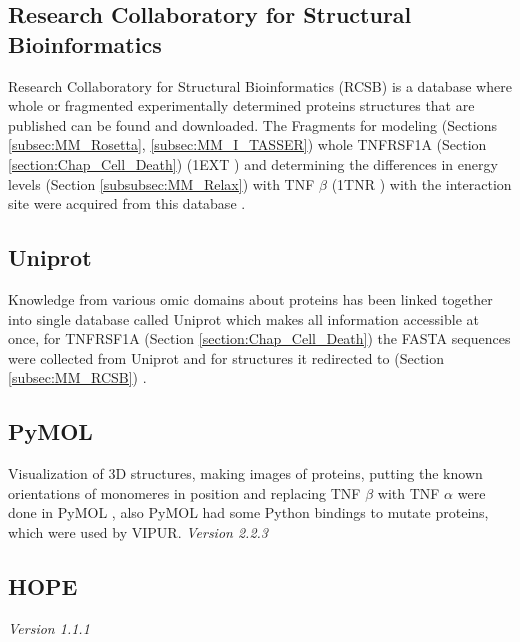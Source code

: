 \subsection{Research Collaboratory for Structural Bioinformatics}
Research Collaboratory for Structural Bioinformatics (RCSB) is a database where whole or fragmented experimentally determined proteins structures that are published can be found and downloaded. The Fragments for modeling (Sections \ref{subsec:MM_Rosetta}, \ref{subsec:MM_I_TASSER}) whole TNFRSF1A (Section \ref{section:Chap_Cell_Death}) (1EXT \cite{}) and determining the differences in energy levels (Section \ref{subsubsec:MM_Relax}) with TNF $\beta$ (1TNR \cite{}) with the interaction site were acquired from this database \cite{}.
\label{subsec:MM_RCSB}

\subsection{Uniprot}
Knowledge from various omic domains about proteins has been linked together into single database called Uniprot which makes all information accessible at once, for TNFRSF1A (Section \ref{section:Chap_Cell_Death}) the FASTA sequences were collected from Uniprot and for structures it redirected to (Section \ref{subsec:MM_RCSB}) \cite{}.
\label{subsec:MM_Uniprot}

\subsection{PyMOL}
Visualization of 3D structures, making images of proteins, putting the known orientations of monomeres in position and replacing TNF $\beta$ with TNF $\alpha$ were done in PyMOL \cite{}, also PyMOL had some Python bindings to mutate proteins, which were used by VIPUR.
\label{subsec:MM_PyMOL}
\newline
\textit{Version 2.2.3}

\subsection{HOPE}
\label{subsec:MM_HOPE}
\textit{Version 1.1.1}

